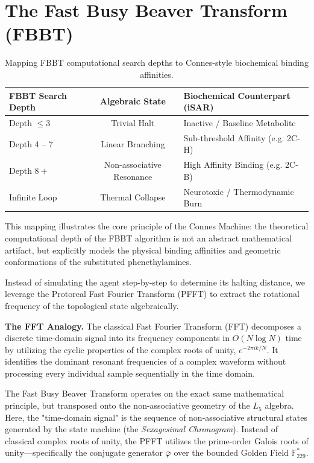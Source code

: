 \documentclass[12pt,oneside]{article}
\theoremstyle{principia}
\theoremstyle{definition}
\theoremstyle{remark}
\begin{document}
\section{The Fast Busy Beaver Transform (FBBT)}

\begin{table}[ht]
\centering
\begin{tabular}{|l|c|l|}
\hline
\textbf{FBBT Search Depth} & \textbf{Algebraic State} & \textbf{Biochemical Counterpart (iSAR)} \\
\hline
Depth $\leq 3$ & Trivial Halt & Inactive / Baseline Metabolite \\
Depth 4 -- 7 & Linear Branching & Sub-threshold Affinity (e.g. 2C-H) \\
Depth $8+$ & Non-associative Resonance & High Affinity Binding (e.g. 2C-B) \\
Infinite Loop & Thermal Collapse & Neurotoxic / Thermodynamic Burn \\
\hline
\end{tabular}
\caption{Mapping FBBT computational search depths to Connes-style biochemical binding affinities.}
\label{tab:fbbt_biochem}
\end{table}

This mapping illustrates the core principle of the Connes Machine: the theoretical computational depth of the FBBT algorithm is not an abstract mathematical artifact, but explicitly models the physical binding affinities and geometric conformations of the substituted phenethylamines.

Instead of simulating the agent step-by-step to determine its halting distance, we leverage the Protoreal Fast Fourier Transform (PFFT) to extract the rotational frequency of the topological state algebraically. 

\textbf{The FFT Analogy.} The classical Fast Fourier Transform (FFT) decomposes a discrete time-domain signal into its frequency components in $O(N \log N)$ time by utilizing the cyclic properties of the complex roots of unity, $e^{-2\pi i k / N}$. It identifies the dominant resonant frequencies of a complex waveform without processing every individual sample sequentially in the time domain. 

The Fast Busy Beaver Transform operates on the exact same mathematical principle, but transposed onto the non-associative geometry of the $L_5$ algebra. Here, the "time-domain signal" is the sequence of non-associative structural states generated by the state machine (the \textit{Sexagesimal Chronogram}). Instead of classical complex roots of unity, the PFFT utilizes the prime-order Galois roots of unity---specifically the conjugate generator $\bar{\varphi}$ over the bounded Golden Field $\mathbb{F}_{229}^*$. 
\end{document}
